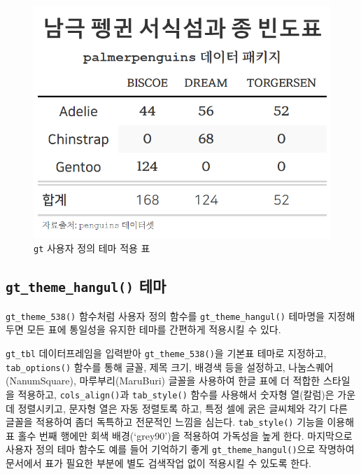 \documentclass[
  letterpaper,
]{book}
\begin{document}
\begin{figure}

{\centering \includegraphics[width=4.64583in,height=\textheight]{images/penguins_theme_gt.png}

}

\caption{\texttt{gt} 사용자 정의 테마 적용 표}

\end{figure}

\hypertarget{gt_theme_hangul-uxd14cuxb9c8}{%
\subsection{\texorpdfstring{\texttt{gt\_theme\_hangul()}
테마}{gt\_theme\_hangul() 테마}}\label{gt_theme_hangul-uxd14cuxb9c8}}

\texttt{gt\_theme\_538()} 함수처럼 사용자 정의 함수를
\texttt{gt\_theme\_hangul()} 테마명을 지정해 두면 모든 표에 통일성을
유지한 테마를 간편하게 적용시킬 수 있다.

\texttt{gt\_tbl} 데이터프레임을 입력받아 \texttt{gt\_theme\_538()}을
기본표 테마로 지정하고, \texttt{tab\_options()} 함수를 통해 글꼴, 제목
크기, 배경색 등을 설정하고, 나눔스퀘어(NanumSquare), 마루부리(MaruBuri)
글꼴을 사용하여 한글 표에 더 적합한 스타일을 적용하고,
\texttt{cols\_align()}과 \texttt{tab\_style()} 함수를 사용해서 숫자형
열(칼럼)은 가운데 정렬시키고, 문자형 열은 자동 정렬토록 하고, 특정 셀에
굵은 글씨체와 각기 다른 글꼴을 적용하여 좀더 독특하고 전문적인 느낌을
심는다. \texttt{tab\_style()} 기능을 이용해 표 홀수 번째 행에만 회색
배경(`grey90')을 적용하여 가독성을 높게 한다. 마지막으로 사용자 정의
테마 함수도 예를 들어 기억하기 좋게 \texttt{gt\_theme\_hangul()}으로
작명하여 문서에서 표가 필요한 부분에 별도 검색작업 없이 적용시킬 수
있도록 한다.
\end{document}
